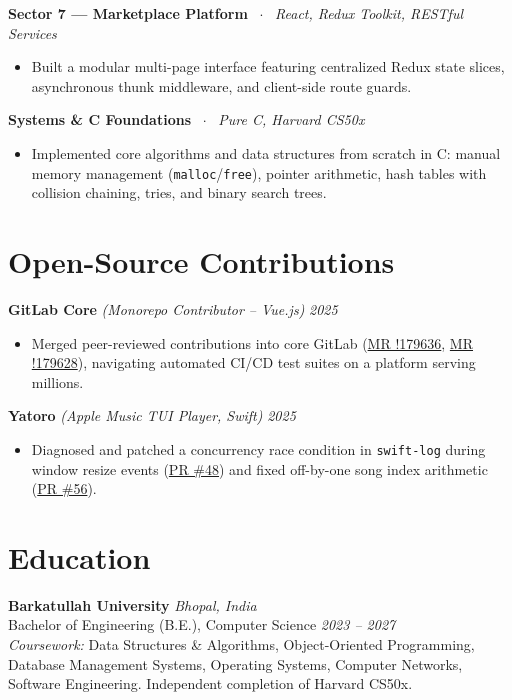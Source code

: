 \documentclass[10pt,a4paper]{article}
\begin{document}
\textbf{Sector 7 — Marketplace Platform} \ $\cdot$ \ \textit{React, Redux Toolkit, RESTful Services}
\begin{itemize}
    \item Built a modular multi-page interface featuring centralized Redux state slices, asynchronous thunk middleware, and client-side route guards.
\end{itemize}

\textbf{Systems \& C Foundations} \ $\cdot$ \ \textit{Pure C, Harvard CS50x}
\begin{itemize}
    \item Implemented core algorithms and data structures from scratch in C: manual memory management (\texttt{malloc}/\texttt{free}), pointer arithmetic, hash tables with collision chaining, tries, and binary search trees.
\end{itemize}

\section{Open-Source Contributions}
\textbf{GitLab Core} \textit{(Monorepo Contributor -- Vue.js)} \hfill \textit{2025}
\begin{itemize}
    \item Merged peer-reviewed contributions into core GitLab (\href{https://gitlab.com/gitlab-org/gitlab/-/merge_requests/179636}{MR !179636}, \href{https://gitlab.com/gitlab-org/gitlab/-/merge_requests/179628}{MR !179628}), navigating automated CI/CD test suites on a platform serving millions.
\end{itemize}

\textbf{Yatoro} \textit{(Apple Music TUI Player, Swift)} \hfill \textit{2025}
\begin{itemize}
    \item Diagnosed and patched a concurrency race condition in \texttt{swift-log} during window resize events (\href{https://github.com/jayadamsmorgan/Yatoro/pull/48}{PR \#48}) and fixed off-by-one song index arithmetic (\href{https://github.com/jayadamsmorgan/Yatoro/pull/56}{PR \#56}).
\end{itemize}

\section{Education}
\textbf{Barkatullah University} \hfill \textit{Bhopal, India} \\
Bachelor of Engineering (B.E.), Computer Science \hfill \textit{2023 -- 2027} \\
\textit{Coursework:} Data Structures \& Algorithms, Object-Oriented Programming, Database Management Systems, Operating Systems, Computer Networks, Software Engineering. Independent completion of Harvard CS50x.
\end{document}

